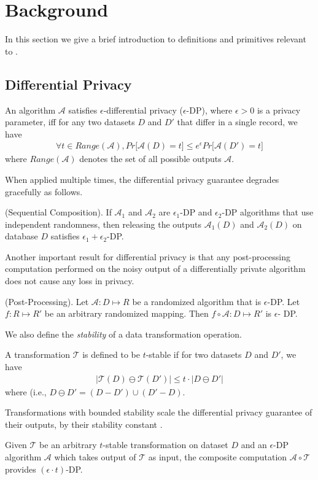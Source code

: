 
\section{Background}\label{sec:background}
In this section we give a brief introduction to definitions and primitives relevant to \system. 

\subsection{Differential Privacy}
\begin{definition} An algorithm $\mathcal{A}$
satisfies $\epsilon$-differential privacy ($\epsilon$-DP), where $\epsilon > 0$ is a privacy parameter, iff
 for any two datasets $D$ and $D'$ that differ in a single record, we have
\begin{gather}
\forall t \in Range(\mathcal{A}), Pr \big[\mathcal{A}(D) = t\big] \leq e^{\epsilon}Pr\big[\mathcal{A}(D') = t\big]
\end{gather}
where $Range(\mathcal{A})$ denotes the set of all possible outputs
$\mathcal{A}$.
\end{definition} 
When applied multiple times, the differential privacy guarantee degrades gracefully as follows.
\begin{theorem}(Sequential Composition). If $\mathcal{A}_1$ and
$\mathcal{A}_2$ are $\epsilon_1$-DP and $\epsilon_2$-DP algorithms that use independent randomness, then releasing the outputs $\mathcal{A}_1(D)$ and
$\mathcal{A}_2(D)$ on database $D$ satisfies $\epsilon_1+\epsilon_2$-DP.\end{theorem} 
Another important result for differential privacy is that any post-processing computation performed on the noisy output of a differentially private algorithm does not cause any loss in privacy.
\begin{theorem}(Post-Processing). Let $\mathcal{A}: D \mapsto R$ be a randomized
algorithm that is $\epsilon$-DP. Let $f : R \mapsto R'$ be an
arbitrary randomized mapping. Then $f \circ \mathcal{A} : D \mapsto R'$ is $\epsilon$-
DP. \label{post}\end{theorem}
We also define the \emph{stability} of a data transformation operation.
\begin{definition}A transformation $\mathcal{T}$ is defined to be $t$-stable if for two datasets $D$ and $D'$, we have\begin{gather}|\mathcal{T}(D)\ominus \mathcal{T}(D')| \leq t \cdot |D\ominus D'|  \end{gather} where  (i.e.,  $D \ominus D' = (D-D') \cup (D'-D)$. \end{definition}
Transformations with bounded stability scale the differential privacy guarantee of their outputs, by their stability constant \cite{PINQ}.
\begin{theorem}
Given $\mathcal{T}$ be an arbitrary $t$-stable transformation on dataset $D$ and an $\epsilon$-DP algorithm $\mathcal{A}$ which takes output of $\mathcal{T}$ as input, the composite computation $\mathcal{A} \circ \mathcal{T}$ provides $(\epsilon \cdot t)$-DP.\end{theorem}

